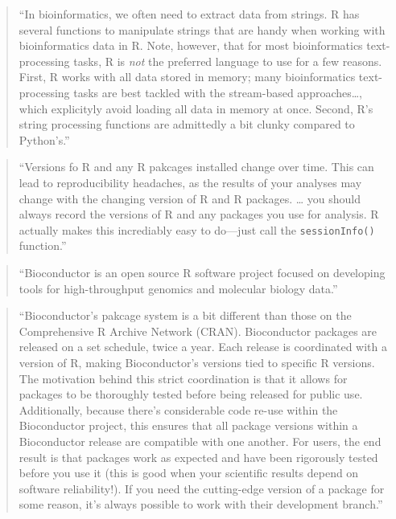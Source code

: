 \documentclass[]{tufte-book}
\begin{document}
\begin{quote}
``In bioinformatics, we often need to extract data from strings. R has several
functions to manipulate strings that are handy when working with bioinformatics data in
R. Note, however, that for most bioinformatics text-processing tasks, R is \emph{not}
the preferred language to use for a few reasons. First, R works with all data stored
in memory; many bioinformatics text-processing tasks are best tackled with the
stream-based approaches\ldots, which explicityly avoid loading all data in memory at
once. Second, R's string processing functions are admittedly a bit clunky compared
to Python's.'' \citep{buffalo2015bioinformatics}
\end{quote}

\begin{quote}
``Versions fo R and any R pakcages installed change over time. This can lead to
reproducibility headaches, as the results of your analyses may change with the
changing version of R and R packages. \ldots{} you should always record the versions
of R and any packages you use for analysis. R actually makes this incrediably
easy to do---just call the \texttt{sessionInfo()} function.'' \citep{buffalo2015bioinformatics}
\end{quote}

\begin{quote}
``Bioconductor is an open source R software project focused on developing tools
for high-throughput genomics and molecular biology data.'' \citep{buffalo2015bioinformatics}
\end{quote}

\begin{quote}
``Bioconductor's pakcage system is a bit different than those on the Comprehensive R
Archive Network (CRAN). Bioconductor packages are released on a set schedule, twice
a year. Each release is coordinated with a version of R, making Bioconductor's versions
tied to specific R versions. The motivation behind this strict coordination is that it
allows for packages to be thoroughly tested before being released for public use.
Additionally, because there's considerable code re-use within the Bioconductor project,
this ensures that all package versions within a Bioconductor release are compatible
with one another. For users, the end result is that packages work as expected and
have been rigorously tested before you use it (this is good when your scientific
results depend on software reliability!). If you need the cutting-edge version of a
package for some reason, it's always possible to work with their development branch.''
\citep{buffalo2015bioinformatics}
\end{quote}
\end{document}
